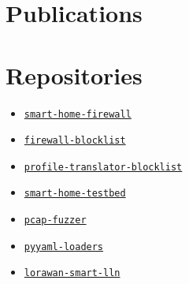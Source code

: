 \documentclass[]{deedy-resume-openfont}
\begin{document}
\begin{minipage}[t]{0.35\textwidth} 


\vspace{-5pt}
\section{Publications}
\vspace{0.7cm}
\renewcommand\refname{\vskip -1.5cm} %


\nocite{forest}
\nocite{smart-home-firewall}
\nocite{survey}
\vspace{-11pt}



\section{Repositories}
\renewcommand\refname{\vskip -1.5cm} %
\begin{itemize}
    \item \href{https://github.com/smart-home-network-security/smart-home-firewall}{\texttt{smart-home-firewall}}
    \item \href{https://github.com/smart-home-network-security/firewall-blocklist}{\texttt{firewall-blocklist}}
    \item \href{https://github.com/smart-home-network-security/profile-translator-blocklist}{\texttt{profile-translator-blocklist}}
    \item \href{https://github.com/smart-home-network-security/smart-home-testbed}{\texttt{smart-home-testbed}}
    \item \href{https://github.com/smart-home-network-security/pcap-fuzzer}{\texttt{pcap-fuzzer}}
    \item \href{https://github.com/smart-home-network-security/pyyaml-loaders}{\texttt{pyyaml-loaders}}
    \item \href{https://github.com/fdekeers/lorawan-smart-lln}{\texttt{lorawan-smart-lln}}
\end{itemize}
\vspace{-11pt}


\end{minipage}
\end{document}
